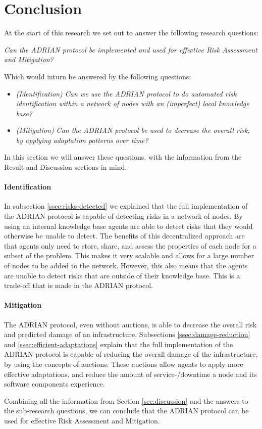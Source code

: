 \section{Conclusion}
\label{sec:conclusion}

At the start of this research we set out to answer the following research questions:

\vspace{0.5em}
\emph{Can the ADRIAN protocol be implemented and used for effective Risk Assessment and Mitigation?}
\vspace{0.5em}

Which would inturn be answered by the following questions: 
\begin{itemize}
    \item \textit{(Identification) Can we use the ADRIAN protocol to do automated risk identification within a network of nodes with an (imperfect) local knowledge base?}
    \item \textit{(Mitigation) Can the ADRIAN protocol be used to decrease the overall risk, by applying adaptation patterns over time?}
\end{itemize}

In this section we will answer these questions, with the information from the Result and Discussion sections in mind.

\paragraph*{Identification}
In subsection \ref{ssec:risks-detected} we explained that the full implementation of the ADRIAN protocol is capable of detecting risks in a network of nodes. By using an internal knowledge base agents are able to detect risks that they would otherwise be unable to detect. The benefits of this decentralized approach are that agents only need to store, share, and assess the properties of each node for a subset of the problem. This makes it very scalable and allows for a large number of nodes to be added to the network. However, this also means that the agents are unable to detect risks that are outside of their knowledge base. This is a trade-off that is made in the ADRIAN protocol. 

\paragraph*{Mitigation}
The ADRIAN protocol, even without auctions, is able to decrease the overall risk and predicted damage of an infrastructure.
Subsections \ref{ssec:damage-reduction} and \ref{ssec:efficient-adaptations} explain that the full implementation of the ADRIAN protocol is capable of reducing the overall damage of the infrastructure, by using the concepts of auctions. These auctions allow agents to apply more effective adaptations, and reduce the amount of service-/downtime a node and its software components experience. 


\vspace{0.5em}
Combining all the information from Section \ref{sec:discussion} and the answers to the sub-research questions, we can conclude that the ADRIAN protocol can be used for effective Risk Assessment and Mitigation. 
